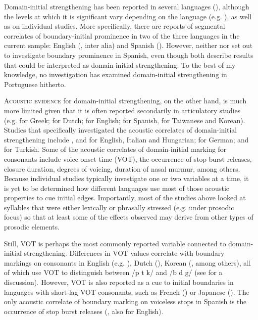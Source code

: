 \documentclass[output=paper]{langscibook}
\begin{document}
Domain-initial strengthening has been reported in several languages (\citealt{c15}), although the levels at which it is significant vary depending on the language (e.g. \citealt{kcfh03}), as well as on individual studies. More specifically, there are reports of segmental correlates of boundary-initial prominence in two of the three languages in the current sample: English (\citealt{pt92, fk97, b}, inter alia) and Spanish (\citealt{l01, p14}). However, neither \citet{l01} nor \citet{p14} set out to investigate boundary prominence in Spanish, even though both describe results that could be interpreted as domain-initial strengthening. To the best of my knowledge, no investigation has examined domain-initial strengthening in Portuguese hitherto. 

\textsc{Acoustic evidence} for domain-initial strengthening, on the other hand, is much more limited given that it is often reported secondarily in articulatory studies (e.g. \citealt{k16} for Greek; \citealt{cm05} for Dutch; \citealt{o73, t03} for English; \citealt{l01, p14} for Spanish, \citealt{hj98} for Taiwanese and Korean). Studies that specifically investigated the acoustic correlates of domain-initial strengthening include \citet{cmc07, ckch07}, and \citet{wbm20} for English, Italian and Hungarian; \citet{kce07} for German; and \citet{bbptg21} for Turkish. Some of the acoustic correlates of domain-initial marking for consonants include voice onset time (VOT), the occurrence of stop burst releases, closure duration, degrees of voicing, duration of nasal murmur, among others. Because individual studies typically investigate one or two variables at a time, it is yet to be determined how different languages use most of those acoustic properties to cue initial edges. Importantly, most of the studies above looked at syllables that were either lexically or phrasally stressed (e.g. under prosodic focus) so that at least some of the effects observed may derive from other types of prosodic elements. 

Still, VOT is perhaps the most commonly reported variable connected to do\-main-ini\-tial strengthening. Differences in VOT values correlate with boundary markings on consonants in English (e.g. \citealt{pt92, bdjl92, ck01}), Dutch (\citealt{cmc07}), Korean (\citealt{ck01}, among others), all of which use VOT to distinguish between /p t k/ and /b d g/ (see \citealt{cwd19} for a discussion). However, VOT is also reported as a cue to initial boundaries in languages with short-lag VOT consonants, such as French (\citealt{Fougeron2001}) or Japanese (\citealt{owph03}). The only acoustic correlate of boundary marking on voiceless stops in Spanish is the occurrence of stop burst releases (\citealt{l01}, also for English). 
\end{document}
